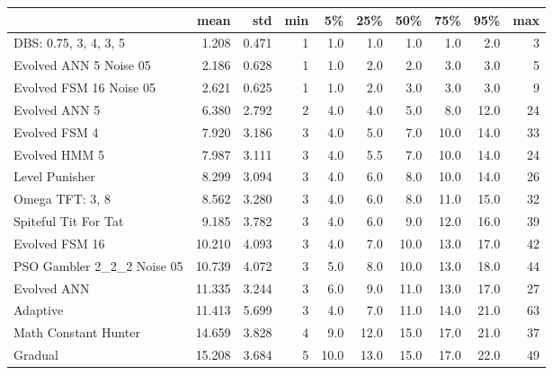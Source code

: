 \begin{tabular}{lrrrrrrrrr}
\toprule
{} &    mean &    std &  min &    5\% &   25\% &   50\% &   75\% &   95\% &  max \\
\midrule
DBS: 0.75, 3, 4, 3, 5      &   1.208 &  0.471 &    1 &   1.0 &   1.0 &   1.0 &   1.0 &   2.0 &    3 \\
Evolved ANN 5 Noise 05     &   2.186 &  0.628 &    1 &   1.0 &   2.0 &   2.0 &   3.0 &   3.0 &    5 \\
Evolved FSM 16 Noise 05    &   2.621 &  0.625 &    1 &   1.0 &   2.0 &   3.0 &   3.0 &   3.0 &    9 \\
Evolved ANN 5              &   6.380 &  2.792 &    2 &   4.0 &   4.0 &   5.0 &   8.0 &  12.0 &   24 \\
Evolved FSM 4              &   7.920 &  3.186 &    3 &   4.0 &   5.0 &   7.0 &  10.0 &  14.0 &   33 \\
Evolved HMM 5              &   7.987 &  3.111 &    3 &   4.0 &   5.5 &   7.0 &  10.0 &  14.0 &   24 \\
Level Punisher             &   8.299 &  3.094 &    3 &   4.0 &   6.0 &   8.0 &  10.0 &  14.0 &   26 \\
Omega TFT: 3, 8            &   8.562 &  3.280 &    3 &   4.0 &   6.0 &   8.0 &  11.0 &  15.0 &   32 \\
Spiteful Tit For Tat       &   9.185 &  3.782 &    3 &   4.0 &   6.0 &   9.0 &  12.0 &  16.0 &   39 \\
Evolved FSM 16             &  10.210 &  4.093 &    3 &   4.0 &   7.0 &  10.0 &  13.0 &  17.0 &   42 \\
PSO Gambler 2\_2\_2 Noise 05 &  10.739 &  4.072 &    3 &   5.0 &   8.0 &  10.0 &  13.0 &  18.0 &   44 \\
Evolved ANN                &  11.335 &  3.244 &    3 &   6.0 &   9.0 &  11.0 &  13.0 &  17.0 &   27 \\
Adaptive                   &  11.413 &  5.699 &    3 &   4.0 &   7.0 &  11.0 &  14.0 &  21.0 &   63 \\
Math Constant Hunter       &  14.659 &  3.828 &    4 &   9.0 &  12.0 &  15.0 &  17.0 &  21.0 &   37 \\
Gradual                    &  15.208 &  3.684 &    5 &  10.0 &  13.0 &  15.0 &  17.0 &  22.0 &   49 \\
\bottomrule
\end{tabular}
